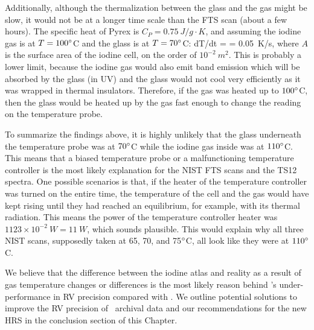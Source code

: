 Additionally, although the thermalization between the glass and the
gas might be slow, it would not be at a longer time scale than
the FTS scan (about a few hours). The specific heat of Pyrex is
$C_P = 0.75\ J/g\cdot K$, and assuming the iodine gas is at
$T=100^{\circ}$C and the glass is at $T=70^{\circ}$C:
\beq
dT/dt =  = 0.05\ K/s,
\eeq 
where $A$ is the surface area of the iodine cell, on the order of
$10^{-2}\ m^2$. This is probably a lower limit, because the iodine gas
would also emit band emission which will be absorbed by the glass (in
UV) and the glass would not cool very efficiently as it was wrapped in
thermal insulators. Therefore, if the gas was heated up to
$100^{\circ}$C, then the glass would be heated up by the gas fast
enough to change the reading on the temperature probe.

To summarize the findings above, it is highly unlikely that the glass
underneath the temperature probe was at $70^{\circ}$C while the iodine
gas inside was at $110^{\circ}$C. This means that a biased temperature
probe or a malfunctioning temperature controller is the most likely
explanation for the NIST FTS scans and the TS12 spectra. One possible
scenarios is that, if the heater
of the temperature controller was turned on the entire time, the
temperature of the cell and the gas would have kept rising until they
had reached an equilibrium, for example, with its thermal
radiation. This means the power of the temperature controller heater
was $1123 \times 10^{-2}\ W = 11\ W$, which sounds plausible. This
would explain why all three NIST scans, supposedly taken at 65, 70,
and 75$^{\circ}$C, all look like they were at $110^{\circ}$C.

We believe that the difference between the iodine atlas
and reality as a result of gas temperature changes or differences is the
most likely reason behind \het's under-performance in RV precision
compared with \keck. We outline potential solutions to improve the RV
precision of \het\ archival data and our recommendations for the new
HRS in the conclusion section of this Chapter.

